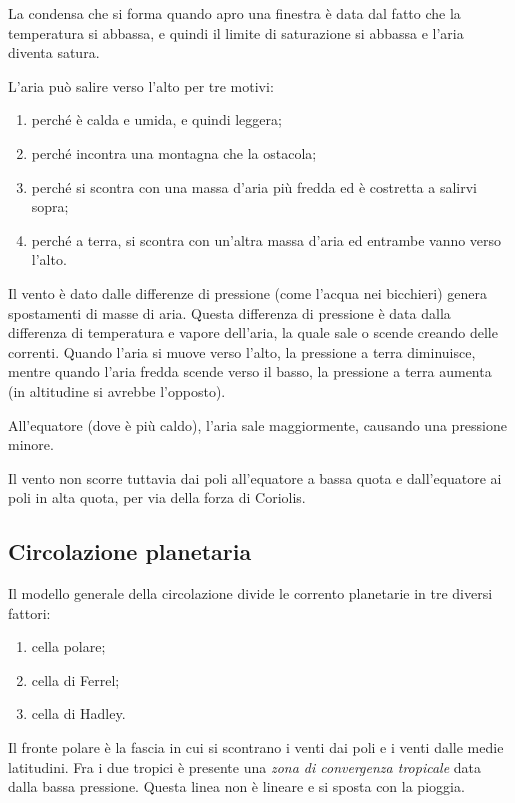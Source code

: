 \documentclass[a4paper]{article}
\begin{document}
La condensa che si forma quando apro una finestra è data dal fatto che la temperatura si abbassa, e quindi
il limite di saturazione si abbassa e l'aria diventa satura.

L'aria può salire verso l'alto per tre motivi:
\begin{enumerate}
    \item perché è calda e umida, e quindi leggera;
    \item perché incontra una montagna che la ostacola;
    \item perché si scontra con una massa d'aria più fredda ed è costretta a salirvi sopra;
    \item perché a terra, si scontra con un'altra massa d'aria ed entrambe vanno verso l'alto.
\end{enumerate}

Il vento è dato dalle differenze di pressione (come l'acqua nei bicchieri)
genera spostamenti di masse di aria.
Questa differenza di pressione è data dalla differenza di temperatura e vapore dell'aria,
la quale sale o scende creando delle correnti.
Quando l'aria si muove verso l'alto, la pressione a terra diminuisce,
mentre quando l'aria fredda scende verso il basso, la pressione a terra aumenta
(in altitudine si avrebbe l'opposto).

All'equatore (dove è più caldo), l'aria sale maggiormente, causando una pressione minore.

Il vento non scorre tuttavia dai poli all'equatore a bassa quota e dall'equatore ai poli in alta quota,
per via della forza di Coriolis.

\subsection{Circolazione planetaria}

Il modello generale della circolazione divide le corrento planetarie in tre diversi fattori:
\begin{enumerate}
    \item cella polare;
    \item cella di Ferrel;
    \item cella di Hadley.
\end{enumerate}

Il fronte polare è la fascia in cui si scontrano i venti dai poli e i venti dalle medie latitudini.
Fra i due tropici è presente una \textit{zona di convergenza tropicale} data dalla bassa pressione.
Questa linea non è lineare e si sposta con la pioggia.
\end{document}
